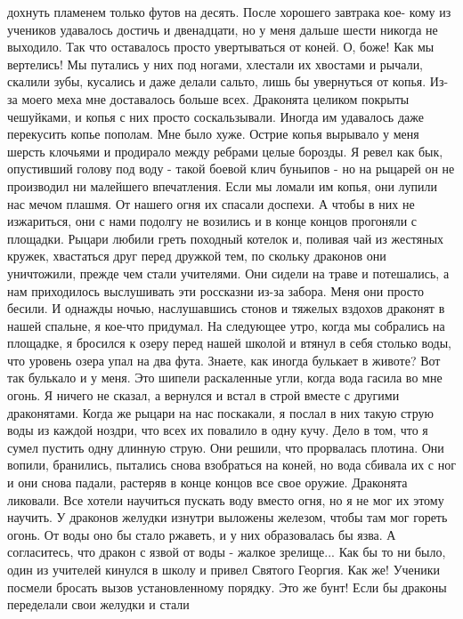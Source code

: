 дохнуть пламенем только футов на десять. После хорошего завтрака кое-
кому из учеников удавалось достичь и двенадцати, но у меня дальше 
шести никогда не выходило. Так что оставалось просто увертываться от 
коней. О, боже! Как мы вертелись! Мы путались у них под ногами, 
хлестали их хвостами и рычали, скалили зубы, кусались и даже делали 
сальто, лишь бы увернуться от копья. Из-за моего меха мне доставалось 
больше всех. Драконята целиком покрыты чешуйками, и копья с них просто 
соскальзывали. Иногда им удавалось даже перекусить копье пополам. Мне 
было хуже. Острие копья вырывало у меня шерсть клочьями и продирало 
между ребрами целые борозды. Я ревел как бык, опустивший голову под 
воду - такой боевой клич буньипов - но на рыцарей он не производил ни 
малейшего впечатления.
    Если мы ломали им копья, они лупили нас мечом плашмя. От нашего 
огня их спасали доспехи. А чтобы в них не изжариться, они с нами 
подолгу не возились и в конце концов прогоняли с площадки.
    Рыцари любили греть походный котелок и, поливая чай из жестяных 
кружек, хвастаться друг перед дружкой тем, по скольку драконов они 
уничтожили, прежде чем стали учителями. Они сидели на траве и 
потешались, а нам приходилось выслушивать эти россказни из-за забора.
    Меня они просто бесили. И однажды ночью, наслушавшись стонов и 
тяжелых вздохов драконят в нашей спальне, я кое-что придумал. На 
следующее утро, когда мы собрались на площадке, я бросился к озеру 
перед нашей школой и втянул в себя столько воды, что уровень озера 
упал на два фута. Знаете, как иногда булькает в животе? Вот так 
булькало и у меня. Это шипели раскаленные угли, когда вода гасила во 
мне огонь. Я ничего не сказал, а вернулся и встал в строй вместе с 
другими драконятами. Когда же рыцари на нас поскакали, я послал в них 
такую струю воды из каждой ноздри, что всех их повалило в одну кучу. 
Дело в том, что я сумел пустить одну длинную струю. Они решили, что 
прорвалась плотина. Они вопили, бранились, пытались снова взобраться 
на коней, но вода сбивала их с ног и они снова падали, растеряв в 
конце концов все свое оружие.
    Драконята ликовали. Все хотели научиться пускать воду вместо огня, 
но я не мог их этому научить. У драконов желудки изнутри выложены 
железом, чтобы там мог гореть огонь. От воды оно бы стало ржаветь, и у 
них образовалась бы язва. А согласитесь, что дракон с язвой от воды - 
жалкое зрелище...
    Как бы то ни было, один из учителей кинулся в школу и привел 
Святого Георгия. Как же! Ученики посмели бросать вызов установленному 
порядку. Это же бунт! Если бы драконы переделали свои желудки и стали 
